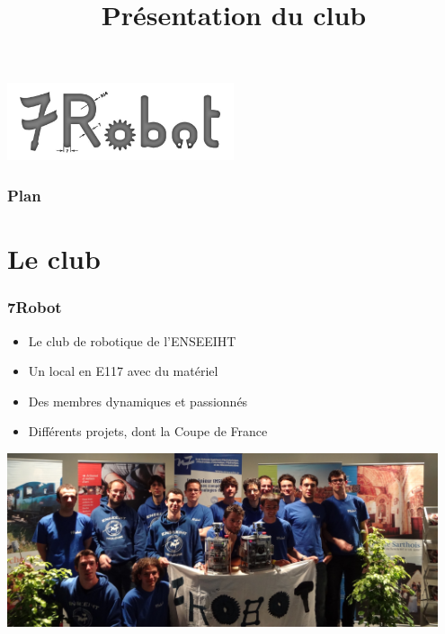 \documentclass[9pt]{beamer}
\title[7Robot \hspace{0.1cm}Présentation du club]{Présentation du club}
\institute{ ENSEEIHT}
\begin{document}


\begin{frame}
	\frametitle{}
	
	\begin{center}
		\includegraphics[width=0.5\textwidth]{logo}
	\end{center}
	
	\vspace{-1.2cm}
	
	\titlepage
	
\end{frame}

{
  \begin{frame}
    \frametitle{Plan}
  \end{frame}
}


\section[Le club]{Le club}

\begin{frame}
	\frametitle{7Robot}
	\begin{itemize}
		\item Le club de robotique de l'ENSEEIHT
		\item Un local en E117 avec du matériel
		\item Des membres dynamiques et passionnés
		\item Différents projets, dont la Coupe de France		
	\end{itemize}
	
	\vspace{0.3cm}
	
	\begin{center}
		\includegraphics[width=0.95\textwidth]{groupe}
	\end{center}

\end{frame}
\end{document}
